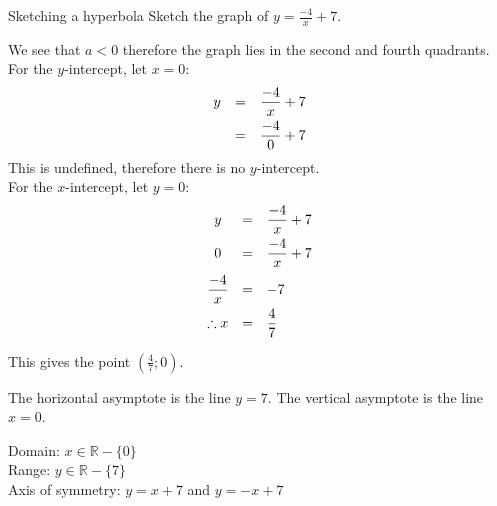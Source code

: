 \begin{wex}
{Sketching a hyperbola}
{Sketch the graph of $y=\frac{-4}{x}+7$.}
{
We see that $a<0$ therefore the graph lies in the second and fourth quadrants.
For the $y$-intercept, let $x=0$:
\begin{equation*}
 \begin{array}{ccc}
 \hfill  y &= & \dfrac{-4}{x}+7 \vspace{4pt}\hfill \\
 \hfill &= & \dfrac {-4}{0} +7  \hfill
 \end{array}
\end{equation*}
This is undefined, therefore there is no $y$-intercept.\vspace{10pt} \\

For the $x$-intercept, let $y=0$:
\begin{equation*}
 \begin{array}{ccl}
 y &=&  \dfrac{-4}{x}+7\vspace{4pt}\\
 0 &=&  \dfrac{-4}{x}+7\vspace{6pt}\\ 
 \dfrac{-4}{x} &=& -7\vspace{4pt} \\
\therefore x &= &\dfrac{4}{7}
 \end{array}
\end{equation*}

This gives the point $\left(\frac{4}{7};0\right)$.


The horizontal asymptote is the line $y=7$. The vertical asymptote is the line $x=0$.

\par
\setcounter{subfigure}{0}
\begin{center}
\end{center}


Domain: $x \in \mathbb{R} - \{0\}$\\
Range: $y \in \mathbb{R} - \{7\}$\\
Axis of symmetry: $y=x+7$ and $y=-x+7$
}
\end{wex}

